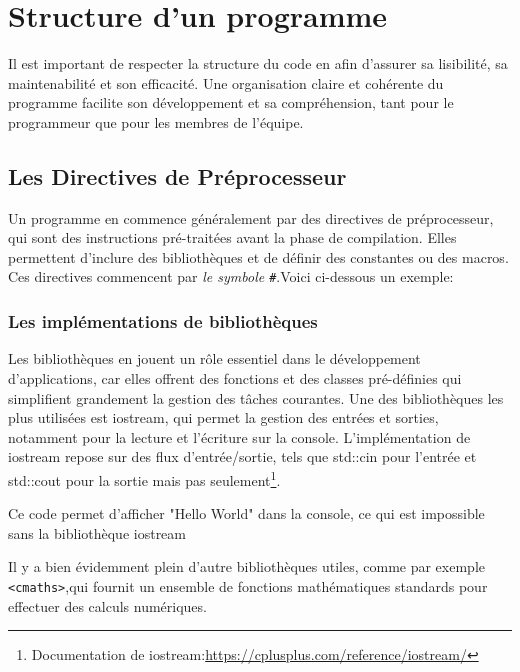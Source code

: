 \chapter{Structure d'un programme}
Il est important de respecter la structure du code en \cpp afin d’assurer sa lisibilité, sa maintenabilité et son efficacité. Une organisation claire et cohérente du programme facilite son développement et sa compréhension, tant pour le programmeur que pour les membres de l’équipe.

\section{Les Directives de Préprocesseur} 
Un programme en \cpp commence généralement par des directives de préprocesseur, qui sont des instructions pré-traitées avant la phase de compilation. Elles permettent d’inclure des bibliothèques et de définir des constantes ou des macros. Ces directives commencent par \emph{le symbole \lstinline|#|}.Voici ci-dessous un exemple:




\subsection{Les implémentations de bibliothèques}
Les bibliothèques en \cpp jouent un rôle essentiel dans le développement d’applications, car elles offrent des fonctions et des classes pré-définies qui simplifient grandement la gestion des tâches courantes. Une des bibliothèques les plus utilisées est iostream, qui permet la gestion des entrées et sorties, notamment pour la lecture et l'écriture sur la console. L'implémentation de iostream repose sur des flux d'entrée/sortie, tels que std::cin pour l'entrée et std::cout pour la sortie mais pas seulement\footnote{Documentation de iostream:\url{https://cplusplus.com/reference/iostream/}}.



Ce code permet d'afficher "Hello World" dans la console, ce qui est impossible sans la bibliothèque iostream

Il y a bien évidemment plein d'autre bibliothèques utiles, comme par exemple \lstinline|<cmaths>|,qui fournit un ensemble de fonctions mathématiques standards pour effectuer des calculs numériques.

